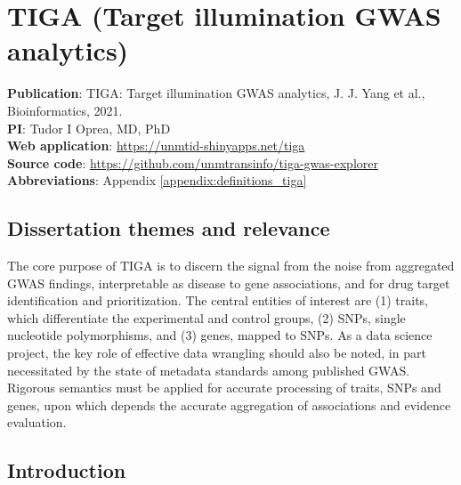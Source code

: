 \chapter{TIGA (Target illumination GWAS analytics)}

\textbf{Publication}: TIGA: Target illumination GWAS analytics, J. J. Yang et al., Bioinformatics, 2021\cite{Yang2021-di}.\\
\textbf{PI}: Tudor I Oprea, MD, PhD\\
\textbf{Web application}: \href{https://unmtid-shinyapps.net/tiga}{https://unmtid-shinyapps.net/tiga}\\
\textbf{Source code}: \href{https://github.com/unmtransinfo/tiga-gwas-explorer}{https://github.com/unmtransinfo/tiga-gwas-explorer}\\
\textbf{Abbreviations}: Appendix \ref{appendix:definitions_tiga}

\section{Dissertation themes and relevance}

The core purpose of TIGA is to discern the signal from the noise from aggregated GWAS findings, interpretable as disease to gene associations, and for drug target identification and prioritization. The central entities of interest are (1) traits, which differentiate the experimental and control groups, (2) SNPs, single nucleotide polymorphisms,  and (3) genes, mapped to SNPs. As a data science project, the key role of effective data wrangling should also be noted, in part necessitated by the state of metadata standards among published GWAS. Rigorous semantics must be applied for accurate processing of traits, SNPs and genes, upon which depends the accurate aggregation of associations and evidence evaluation.

\section{Introduction}

